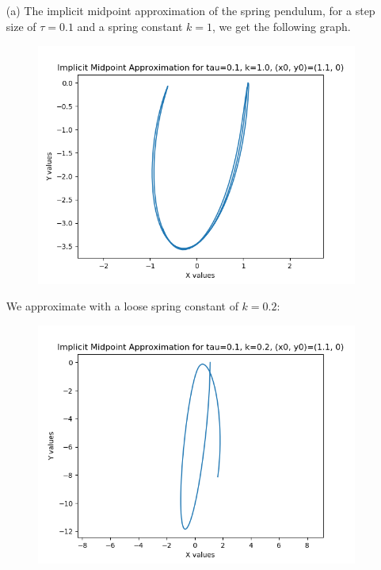 \documentclass{article}
\theoremstyle{definition}
\begin{document}
\subsection{}
\begin{itemize}
	\item[(a)]
		The implicit midpoint approximation of the spring pendulum, for
		a step size of $\tau=0.1$ and a spring constant $k=1$, we get
		the following graph.
		\begin{figure}[H]
			\includegraphics[scale=0.6]{mid_spring_01_1}
		\end{figure}
		We approximate with a loose spring constant of $k=0.2$:
		\begin{figure}[H]
			\includegraphics[scale=0.6]{mid_spring_01_02}

\end{figure}
\end{itemize}
\end{document}
